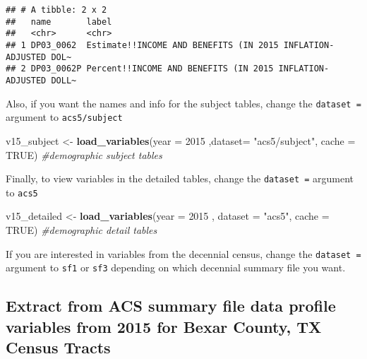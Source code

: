 \documentclass[]{article}
\newenvironment{Shaded}{\begin{snugshade}}{\end{snugshade}}
\newcommand{\KeywordTok}[1]{\textcolor[rgb]{0.13,0.29,0.53}{\textbf{#1}}}
\newcommand{\DataTypeTok}[1]{\textcolor[rgb]{0.13,0.29,0.53}{#1}}
\newcommand{\DecValTok}[1]{\textcolor[rgb]{0.00,0.00,0.81}{#1}}
\newcommand{\StringTok}[1]{\textcolor[rgb]{0.31,0.60,0.02}{#1}}
\newcommand{\CommentTok}[1]{\textcolor[rgb]{0.56,0.35,0.01}{\textit{#1}}}
\newcommand{\OtherTok}[1]{\textcolor[rgb]{0.56,0.35,0.01}{#1}}
\newcommand{\NormalTok}[1]{#1}
\begin{document}
\begin{verbatim}
## # A tibble: 2 x 2
##   name       label                                                         
##   <chr>      <chr>                                                         
## 1 DP03_0062  Estimate!!INCOME AND BENEFITS (IN 2015 INFLATION-ADJUSTED DOL~
## 2 DP03_0062P Percent!!INCOME AND BENEFITS (IN 2015 INFLATION-ADJUSTED DOLL~
\end{verbatim}

Also, if you want the names and info for the subject tables, change the
\texttt{dataset\ =} argument to \texttt{acs5/subject}

\begin{Shaded}
\begin{Highlighting}[]
\NormalTok{v15_subject <-}\StringTok{ }\KeywordTok{load_variables}\NormalTok{(}\DataTypeTok{year =} \DecValTok{2015}\NormalTok{ ,}\DataTypeTok{dataset=} \StringTok{"acs5/subject"}\NormalTok{,}
                              \DataTypeTok{cache =} \OtherTok{TRUE}\NormalTok{) }\CommentTok{#demographic subject tables}
\end{Highlighting}
\end{Shaded}

Finally, to view variables in the detailed tables, change the
\texttt{dataset\ =} argument to \texttt{acs5}

\begin{Shaded}
\begin{Highlighting}[]
\NormalTok{v15_detailed <-}\StringTok{ }\KeywordTok{load_variables}\NormalTok{(}\DataTypeTok{year =} \DecValTok{2015}\NormalTok{ , }\DataTypeTok{dataset =} \StringTok{"acs5"}\NormalTok{,}
                               \DataTypeTok{cache =} \OtherTok{TRUE}\NormalTok{) }\CommentTok{#demographic detail tables}
\end{Highlighting}
\end{Shaded}

If you are interested in variables from the decennial census, change the
\texttt{dataset\ =} argument to \texttt{sf1} or \texttt{sf3} depending
on which decennial summary file you want.

\newpage

\subsection{Extract from ACS summary file data profile variables from
2015 for Bexar County, TX Census
Tracts}\label{extract-from-acs-summary-file-data-profile-variables-from-2015-for-bexar-county-tx-census-tracts}
\end{document}
